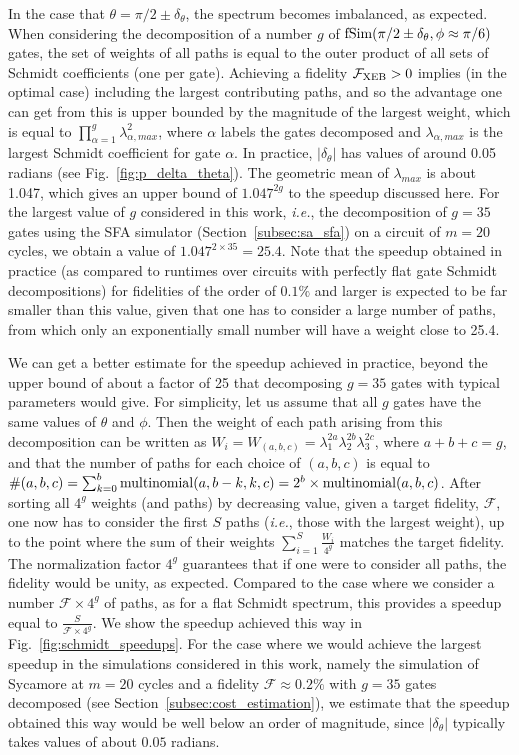 In the case that $\theta=\pi/2\pm\delta_\theta$, the spectrum becomes imbalanced, as expected. When considering the decomposition of a number $g$ of $\rm fSim(\pi/2\pm\delta_\theta, \phi\approx \pi/6)$ gates, the set of weights of all paths is equal to the outer product of all sets of Schmidt coefficients (one per gate). Achieving a fidelity $\mathcal{F}_{\text{XEB}}>0$ implies (in the optimal case) including the largest contributing paths, and so the advantage one can get from this is upper bounded by the magnitude of the largest weight, which is equal to $\prod^g_{\alpha=1} \lambda^2_{\alpha, max}$, where $\alpha$ labels the gates decomposed and $\lambda_{\alpha, max}$ is the largest Schmidt coefficient for gate $\alpha$. In practice, $|\delta_\theta|$ has values of around 0.05 radians (see Fig.~\ref{fig:p_delta_theta}). The geometric mean of $\lambda_{max}$ is about 1.047, which gives an upper bound of $1.047^{2g}$ to the speedup discussed here. For the largest value of $g$ considered in this work, \emph{i.e.}, the decomposition of $g=35$ gates using the SFA simulator (Section~\ref{subsec:sa_sfa}) on a circuit of $m=20$ cycles, we obtain a value of $1.047^{2\times35}=25.4$. Note that the speedup obtained in practice (as compared to runtimes over circuits with perfectly flat gate Schmidt decompositions) for fidelities of the order of $0.1\%$ and larger is expected to be far smaller than this value, given that one has to consider a large number of paths, from which only an exponentially small number will have a weight close to 25.4.

We can get a better estimate for the speedup achieved in practice, beyond the upper bound of about a factor of 25 that decomposing $g=35$ gates with typical parameters would give. For simplicity, let us assume that all $g$ gates have the same values of $\theta$ and $\phi$. Then the weight of each path arising from this decomposition can be written as $W_{i} = W_{(a, b, c)} = \lambda_1^{2a}\lambda_2^{2b}\lambda_3^{2c}$, where $a+b+c=g$, and that the number of paths for each choice of $(a, b, c)$ is equal to $\#(a, b, c) = \sum_{k=0}^{b} {\rm multinomial}(a, b-k, k, c) = 2^b \times {\rm multinomial}(a, b, c)$. After sorting all $4^g$ weights (and paths) by decreasing value, given a target fidelity, $\mathcal{F}$, one now has to consider the first $S$ paths (\emph{i.e.}, those with the largest weight), up to the point where the sum of their weights $\sum_{i=1}^S \frac{W_i}{4^g}$ matches the target fidelity. The normalization factor $4^g$ guarantees that if one were to consider all paths, the fidelity would be unity, as expected. Compared to the case where we consider a number $\mathcal{F}\times 4^g$ of paths, as for a flat Schmidt spectrum, this provides a speedup equal to $\frac{S}{\mathcal{F}\times 4^g}$. We show the speedup achieved this way in Fig.~\ref{fig:schmidt_speedups}. For the case where we would achieve the largest speedup in the simulations considered in this work, namely the simulation of Sycamore at $m=20$ cycles and a fidelity $\mathcal{F}\approx 0.2\%$ with $g=35$ gates decomposed (see Section~\ref{subsec:cost_estimation}), we estimate that the speedup obtained this way would be well below an order of magnitude, since $|\delta_\theta|$ typically takes values of about $0.05$ radians.


